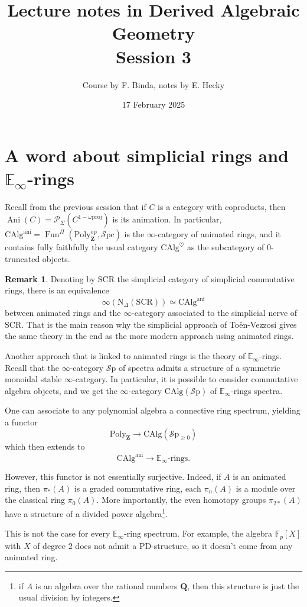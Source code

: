 \documentclass[11pt]{article}
\title{Lecture notes in Derived Algebraic Geometry\\Session 3}
\date{17 February 2025}
\author{Course by F. Binda, notes by E. Hecky}
\theoremstyle{definition}
\newtheorem{remark}[theorem]{Remark}
\newcommand{\Ani}{\operatorname{Ani}}
\newcommand{\ani}{\mathrm{ani}}
\newcommand{\CAlg}{\mathrm{CAlg}}
\newcommand{\Einf}{\mathbb{E}_{\infty}}
\newcommand{\Fun}{\operatorname{Fun}}
\newcommand{\heart}{\heartsuit}
\newcommand{\N}{\mathrm{N}}
\newcommand{\op}{\mathrm{op}}
\renewcommand{\P}{\mathcal{P}}
\newcommand{\Poly}{\mathrm{Poly}}
\newcommand{\proj}{\mathrm{proj}}
\newcommand{\Q}{\mathbf{Q}}
\newcommand{\SCR}{\mathrm{SCR}}
\newcommand{\Sp}{\mathcal{S}\mathrm{p}}
\newcommand{\Spc}{\mathcal{S}\mathrm{pc}}
\newcommand{\Z}{\mathbf{Z}}
\begin{document}
\maketitle

\section{A word about simplicial rings and $\Einf$-rings}

Recall from the previous session that if $C$ is a category with coproducts, then $\Ani(C) = \P_{\Sigma}(C^{1-\omega\proj})$ is its animation.
In particular, $\CAlg^{\ani} = \Fun^{\Pi}(\Poly_{\Z}^{\op}, \Spc)$ is the $\infty$-category of animated rings, and it contains fully faithfully the usual category $\CAlg^{\heart}$ as the subcategory of $0$-truncated objects.

\begin{remark}
    Denoting by $\SCR$ the simplicial category of simplicial commutative rings, there is an equivalence
    \[
        \infty(\N_{\Delta}(\SCR)) \simeq \CAlg^{\ani}
    \]
    between animated rings and the $\infty$-category associated to the simplicial nerve of $\SCR$.
    That is the main reason why the simplicial approach of Toën-Vezzosi gives the same theory in the end as the more modern approach using animated rings.
\end{remark}

Another approach that is linked to animated rings is the theory of $\Einf$-rings.
Recall that the $\infty$-category $\Sp$ of spectra admits a structure of a symmetric monoidal stable $\infty$-category.
In particular, it is possible to consider commutative algebra objects, and we get the $\infty$-category $\CAlg(\Sp)$ of $\Einf$-rings spectra.

One can associate to any polynomial algebra a connective ring spectrum, yielding a functor
\[
    \Poly_{\Z} \to \CAlg(\Sp_{\geqslant 0})
\]
which then extends to
\[
    \CAlg^{\ani} \to \Einf\text{-rings}.
\]

However, this functor is not essentially surjective.
Indeed, if $A$ is an animated ring, then $\pi_*(A)$ is a graded commutative ring, each $\pi_n(A)$ is a module over the classical ring $\pi_0(A)$.
More importantly, the even homotopy groups $\pi_{2*}(A)$ have a structure of a divided power algebra\footnote{if $A$ is an algebra over the rational numbers $\Q$, then this structure is just the usual division by integers.}.

This is not the case for every $\Einf$-ring spectrum.
For example, the algebra $\mathbb{F}_p[X]$ with $X$ of degree $2$ does not admit a PD-structure, so it doesn't come from any animated ring.
\end{document}
